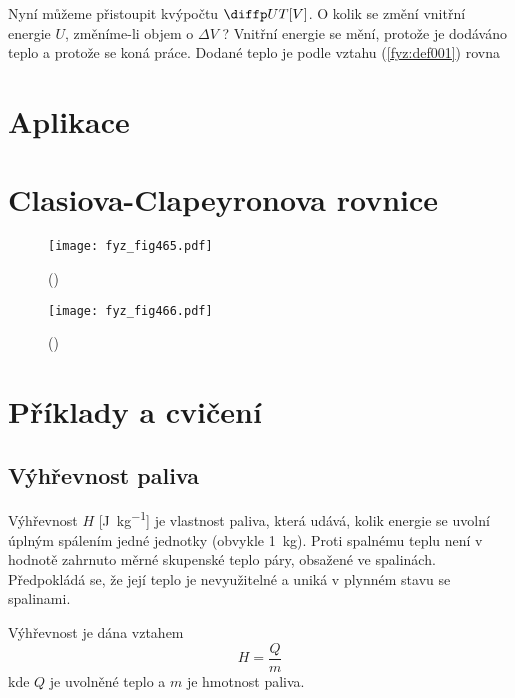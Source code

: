     Nyní můžeme přistoupit kvýpočtu \(\diffp UT[V]\). O kolik se změní vnitřní energie \(U\),
    změníme-li objem o \(\Delta  V\) ? Vnitřní energie se mění, protože je dodáváno teplo a protože
    se koná práce. Dodané teplo je podle vztahu (\ref{fyz:def001}) rovna

  \section{Aplikace}\label{fyz:IchapXLVsecII}
  \section{Clasiova-Clapeyronova rovnice}\label{fyz:IchapXLVsecIII}
  
    \begin{figure}[ht!] %
      \centering
      \texttt{[image: fyz\_fig465.pdf]}
      \caption{ 
              (\cite[s.~707]{Feynman01})}
      \label{fyz:fig465}
    \end{figure}

    \begin{figure}[ht!] %
      \centering
      \texttt{[image: fyz\_fig466.pdf]}
      \caption{ 
              (\cite[s.~707]{Feynman01})}
      \label{fyz:fig466}
    \end{figure}
  \section{Příklady a cvičení}\label{fyz:IchapXLVsecIV}
    \subsection{Výhřevnost paliva}\label{fyz:IchapXLVsecIVssecI}
      Výhřevnost \(H\) [\si{\joule\per\kg}] je vlastnost paliva, která udává, kolik energie se
      uvolní úplným spálením jedné jednotky (obvykle \SI{1}{\kg}). Proti spalnému teplu není v
      hodnotě zahrnuto měrné skupenské teplo páry, obsažené ve spalinách. Předpokládá se, že její
      teplo je nevyužitelné a uniká v plynném stavu se spalinami.

      Výhřevnost je dána vztahem
      \begin{equation*}
        H=\dfrac{Q}{m}
      \end{equation*}
      kde \(Q\) je uvolněné teplo a \(m\) je hmotnost paliva. 

      
      
      
      
    
